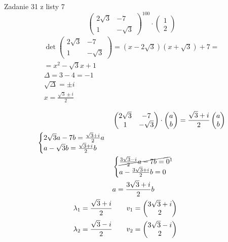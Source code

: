 \begin{prz} Zadanie 31 z listy 7 
    \[ \begin{pmatrix} 2\sqrt{3} & -7 \\ 1 & -\sqrt{3} \end{pmatrix}^{100} \cdot \begin{pmatrix} 1 \\ 2 \end{pmatrix} \]
    \begin{align*}    
        \det \begin{pmatrix} 2\sqrt{3} & -7 \\ 1 & -\sqrt{3} \end{pmatrix} = (x-2\sqrt{3})(x+\sqrt{3}) + 7 = \\ 
        = x^2 - \sqrt{3}x + 1 \\ 
        \Delta = 3 - 4 = -1 \\ 
        \sqrt{\Delta} = \pm i \\ 
        x = \frac{\sqrt{3} \pm i}{2} \\ 
    \end{align*}
    \begin{align*}
        &\begin{pmatrix} 2\sqrt{3} & -7 \\ 1 & -\sqrt{3} \end{pmatrix} \cdot \begin{pmatrix} a \\ b \end{pmatrix} = 
        \frac{\sqrt{3} + i}{2} \begin{pmatrix} a \\ b \end{pmatrix} \\
        \begin{cases} 
            2\sqrt{3}a - 7b = \frac{\sqrt{3}+i}{2}a \\
            a - \sqrt{3} b = \frac{\sqrt{3}+i}{2} b
        \end{cases} \\ 
        &\begin{cases} 
            \cancel{\frac{3\sqrt{3}-i}{2} a - 7b = 0}\footnotemark \\ 
            a - \frac{3\sqrt{3}+i}{2}b = 0
        \end{cases} \\ 
        & a = \frac{3\sqrt{3} + i}{2} b \\ 
        \lambda_1 = \frac{\sqrt{3}+i}{2} & \qquad v_1 = \begin{pmatrix} 3\sqrt{3}+i \\ 2 \end{pmatrix} \\ 
        \lambda_2 = \frac{\sqrt{3}-i}{2} & \qquad v_2 = \begin{pmatrix} 3\sqrt 3-i \\ 2 \end{pmatrix} 
    \end{align*}
\end{prz}
